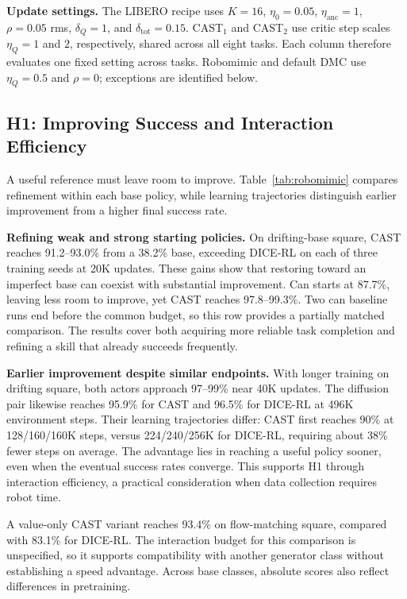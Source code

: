 \textbf{Update settings.}
The LIBERO recipe uses $K=16$, $\eta_0=0.05$, $\eta_{\mathrm{anc}}=1$,
$\rho=0.05$ rms, $\delta_Q=1$, and $\delta_{\mathrm{tot}}=0.15$.
CAST$_1$ and CAST$_2$ use critic step scales $\eta_Q=1$ and $2$,
respectively, shared across all eight tasks. Each column therefore
evaluates one fixed setting across tasks. Robomimic and default DMC use
$\eta_Q=0.5$ and $\rho=0$; exceptions are identified below.

\subsection{H1: Improving Success and Interaction Efficiency}
\label{sec:exp-robomimic}


A useful reference must leave room to improve. Table~\ref{tab:robomimic}
compares refinement within each base policy, while learning trajectories
distinguish earlier improvement from a higher final success rate.

\textbf{Refining weak and strong starting policies.}
On drifting-base square, CAST reaches 91.2--93.0\% from a 38.2\% base,
exceeding DICE-RL on each of three training seeds at 20K updates.
These gains show that restoring toward an imperfect base can coexist
with substantial improvement. Can starts at 87.7\%, leaving less room
to improve, yet CAST reaches 97.8--99.3\%. Two can baseline runs end
before the common budget, so this row provides a partially matched
comparison. The results cover both acquiring more reliable task completion
and refining a skill that already succeeds frequently.

\textbf{Earlier improvement despite similar endpoints.}
With longer training on drifting square, both actors approach 97--99\%
near 40K updates. The diffusion pair likewise reaches 95.9\% for CAST
and 96.5\% for DICE-RL at 496K environment steps. Their learning
trajectories differ: CAST first reaches 90\% at 128/160/160K steps,
versus 224/240/256K for DICE-RL, requiring about 38\% fewer steps on
average. The advantage lies in reaching a useful policy sooner, even
when the eventual success rates converge. This supports H1 through
interaction efficiency, a practical consideration when data collection
requires robot time.

A value-only CAST variant reaches 93.4\% on flow-matching square, compared
with 83.1\% for DICE-RL. The interaction budget for this comparison is
unspecified, so it supports compatibility with another generator class
without establishing a speed advantage. Across base classes, absolute
scores also reflect differences in pretraining.

